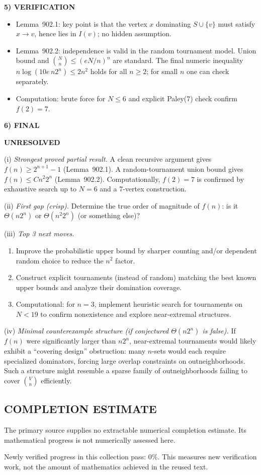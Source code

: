\medskip
\noindent\textbf{5) VERIFICATION}

\begin{itemize}
\item Lemma~902.1: key point is that the vertex $x$ dominating $S\cup\{v\}$ must
satisfy $x\to v$, hence lies in $I(v)$; no hidden assumption.
\item Lemma~902.2: independence is valid in the random tournament model.
Union bound and $\binom{N}{n}\le (eN/n)^n$ are standard.
The final numeric inequality $n\log(10e\,n2^n)\le 2n^2$ holds for all $n\ge 2$;
for small $n$ one can check separately.
\item Computation: brute force for $N\le 6$ and explicit Paley(7) check confirm
$f(2)=7$.
\end{itemize}

\medskip
\noindent\textbf{6) FINAL}

\textbf{UNRESOLVED}

(i) \emph{Strongest proved partial result.}
A clean recursive argument gives $f(n)\ge 2^{n+1}-1$ (Lemma~902.1).
A random-tournament union bound gives $f(n)\le C n^2 2^n$ (Lemma~902.2).
Computationally, $f(2)=7$ is confirmed by exhaustive search up to $N=6$ and a
7-vertex construction.

(ii) \emph{First gap (crisp).}
Determine the true order of magnitude of $f(n)$: is it $\Theta(n2^n)$ or
$\Theta(n^2 2^n)$ (or something else)?

(iii) \emph{Top 3 next moves.}
\begin{enumerate}
\item Improve the probabilistic upper bound by sharper counting and/or dependent
random choice to reduce the $n^2$ factor.
\item Construct explicit tournaments (instead of random) matching the best known
upper bounds and analyze their domination coverage.
\item Computational: for $n=3$, implement heuristic search for tournaments on
$N<19$ to confirm nonexistence and explore near-extremal structures.
\end{enumerate}

(iv) \emph{Minimal counterexample structure (if conjectured $\Theta(n2^n)$ is false).}
If $f(n)$ were significantly larger than $n2^n$, near-extremal tournaments would
likely exhibit a “covering design” obstruction: many $n$-sets would each require
specialized dominators, forcing large overlap constraints on outneighborhoods.
Such a structure might resemble a sparse family of outneighborhoods failing to
cover $\binom{V}{n}$ efficiently.



\subsection*{COMPLETION ESTIMATE}
The primary source supplies no extractable numerical completion estimate. Its mathematical progress is not numerically assessed here.

Newly verified progress in this collection pass: $0\%$. This measures new verification work, not the amount of mathematics achieved in the reused text.
